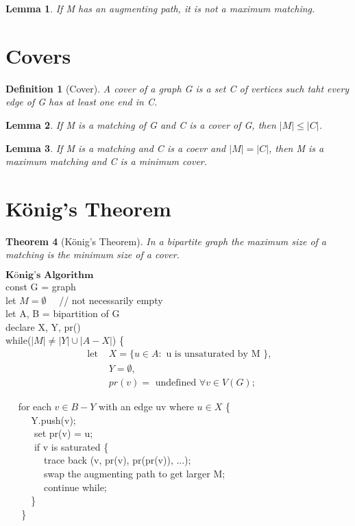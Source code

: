 \documentclass[11pt, oneside]{book}
\theoremstyle{break}
\newtheorem{thm}{Theorem}[section]
\newtheorem{lemma}[thm]{Lemma}
\newtheorem{defn}{Definition}[section]
\begin{document}
\begin{lemma}
	If M has an augmenting path, it is not a maximum matching.
\end{lemma}


\section{Covers}

\begin{defn}[Cover]
	A cover of a graph G is a set C of vertices such taht every edge of G has at least one end in C.
\end{defn}

\begin{lemma}
	If M is a matching of G and C is a cover of G, then $|M| \leq |C|$.
\end{lemma}

\begin{lemma}
	If M is a matching and C is a coevr and $|M| = |C|$, then M is a maximum matching and C is a minimum cover.
\end{lemma}


\section{König's Theorem}

\begin{thm}[König's Theorem]
	In a bipartite graph the maximum size of a matching is the minimum size of a cover.
\end{thm}

$\textbf{König's Algorithm}$ \\
const G = graph\\
let $M = \emptyset \quad$ // not necessarily empty\\
let A, B = bipartition of G\\
declare X, Y, pr()\\
while($|M| \neq |Y| \cup |A - X|$) \{
\begin{align*}
	\text{ let } &X = \{ u \in A : \text{ u is unsaturated by M } \}, \\
					   &Y = \emptyset, \\
					   &pr(v) = \text{ undefined } \forall v \in V(G);
\end{align*}

	$\quad$ for each $v \in B - Y$ with an edge uv where $u \in X$ \{\\
		$\text{ }\quad \quad$Y.push(v); \\
		$\text{ }\quad \quad$ set pr(v) = u;\\
		$ $\\
		$\text{ }\quad \quad$ if v is saturated \{\\
			$\text{ }\quad \quad \quad$ trace back (v, pr(v), pr(pr(v)), ...); \\
			$\text{ }\quad \quad \quad$ swap the augmenting path to get larger M;\\
			$\text{ }\quad \quad \quad$ continue while;\\
		$\text{ }\quad \quad$\}\\
	$\text{ }\quad$\}\\
\end{document}
